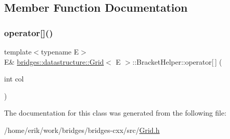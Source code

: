\subsection{Member Function Documentation}
\mbox{\label{classbridges_1_1datastructure_1_1_grid_1_1_bracket_helper_a4cf644b40ea05506e98f7f0863245ecb}} 
\subsubsection{\texorpdfstring{operator[]()}{operator[]()}}
{\footnotesize\ttfamily template$<$typename E$>$ \\
E\& \hyperlink{classbridges_1_1datastructure_1_1_grid}{bridges\+::datastructure\+::\+Grid}$<$ E $>$\+::Bracket\+Helper\+::operator\mbox{[}$\,$\mbox{]} (\begin{DoxyParamCaption}\item[{int}]{col }\end{DoxyParamCaption})\hspace{0.3cm}{\ttfamily [inline]}}



The documentation for this class was generated from the following file\+:\begin{DoxyCompactItemize}
\item 
/home/erik/work/bridges/bridges-\/cxx/src/\hyperlink{_grid_8h}{Grid.\+h}\end{DoxyCompactItemize}
